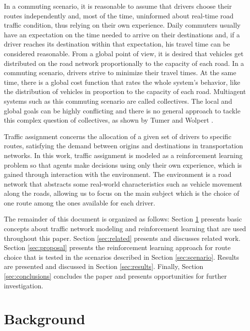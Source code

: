 \documentclass{RITA}
\begin{document}
In a commuting scenario, it is reasonable to assume that drivers choose their routes independently and, most of the time, uninformed about real-time road traffic condition, thus relying on their own experience. Daily commuters usually have an expectation on the time needed to arrive on their destinations and, if a driver reaches its destination within that expectation, his travel time can be considered  reasonable. From a global point of view, it is desired that vehicles get distributed on the road network proportionally to the capacity of each road. In a commuting scenario, drivers strive to minimize their travel times. At the same time, there is a global cost function that rates the whole system's behavior, like the distribution of vehicles in proportion to the capacity of each road. Multiagent systems such as this commuting scenario are called collectives. The local and global goals can be highly conflicting and there is no general approach to tackle this complex question of collectives, as shown by Tumer and Wolpert \cite{Tumer&Wolpert2004}.

Traffic assignment concerns the allocation of a given set of drivers to specific routes, satisfying the demand between origins and destinations in transportation networks. In this work, traffic assignment is modeled as a reinforcement learning problem so that agents make decisions using only their own experience, which is gained through interaction with the environment. The environment is a road network that abstracts some real-world characteristics such as vehicle movement along the roads, allowing us to focus on the main subject which is the choice of one route among the ones available for each driver.

The remainder of this document is organized as follows: Section \ref{sec:concepts} presents basic concepts about traffic network modeling and reinforcement learning that are used throughout this paper. Section \ref{sec:related} presents and discusses related work. Section \ref{sec:proposal} presents the reinforcement learning approach for route choice that is tested in the scenarios described in Section \ref{sec:scenario}. Results are presented and discussed in Section \ref{sec:results}. Finally, Section \ref{sec:conclusions} concludes the paper and presents opportunities for further investigation.

\section{Background}
\label{sec:concepts}
\end{document}
